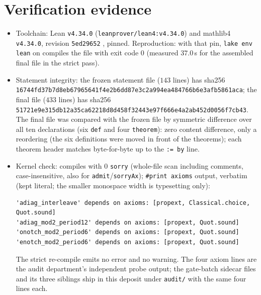 \documentclass[11pt]{article}
\theoremstyle{definition}
\begin{document}
\section{Verification evidence}

\begin{itemize}
\item Toolchain: Lean \texttt{v4.34.0} \cite{lean4}
(\texttt{leanprover/lean4:v4.34.0}) and mathlib4 \texttt{v4.34.0}, revision
\texttt{5ed29652} \cite{mathlib}, pinned. Reproduction: with that pin,
\texttt{lake env lean} on
 compiles the file with exit
code $0$ (measured $37.0$\,s for the assembled final file in the strict pass).
\item Statement integrity: the frozen statement file
 ($143$ lines) has
sha256 \texttt{16744fd3\allowbreak{}7b7d8eb6\allowbreak{}7965641f\allowbreak{}4e2b6dd8\allowbreak{}7e3c2a99\allowbreak{}4ea48476\allowbreak{}6b6e3afb\allowbreak{}5861aca};
the final file  ($433$ lines) has
sha256 \texttt{51721e9e\allowbreak{}315db12a\allowbreak{}35ca6221\allowbreak{}8d8d458f\allowbreak{}32443e97\allowbreak{}f666e4a2\allowbreak{}ab452d00\allowbreak{}56f7cb43}.
The final file was compared with the frozen file by symmetric difference over
all ten declarations (six \texttt{def} and four \texttt{theorem}): zero content
difference, only a reordering (the six definitions were moved in front of the
theorems); each theorem header matches byte-for-byte up to the
\texttt{:= by} line.
\item Kernel check: compiles with $0$ \texttt{sorry} (whole-file scan including
comments, case-insensitive, also for \texttt{admit}/\texttt{sorryAx});
\texttt{\#print axioms} output, verbatim (kept literal; the smaller monospace
width is typesetting only):
\begin{lstlisting}[basicstyle=\ttfamily\footnotesize,frame=none]
'adiag_interleave' depends on axioms: [propext, Classical.choice, Quot.sound]
'adiag_mod2_period12' depends on axioms: [propext, Quot.sound]
'onotch_mod2_period6' depends on axioms: [propext, Quot.sound]
'enotch_mod2_period6' depends on axioms: [propext, Quot.sound]
\end{lstlisting}
The strict re-compile emits no error and no warning. The four axiom lines are
the audit department's independent probe output; the gate-batch sidecar files
 and its three siblings ship in this
deposit under \texttt{audit/} with the same four lines each.

\end{itemize}
\end{document}
